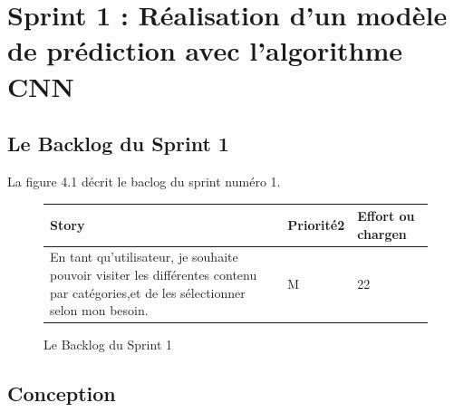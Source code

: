 \chapter{Sprint 1 : Réalisation d’un modèle de prédiction avec l’algorithme CNN}
\label{Chapitre 4} %


\section{Le Backlog du Sprint 1}
La figure 4.1 décrit le baclog du sprint numéro 1.
\begin{figure}[H]
\begin{tabular}{|p{7cm}|p{4cm}|p{4cm}|}
\hline
\textbf{Story} & \textbf{Priorité2 } & \textbf{Effort ou chargen} \\
\hline
En tant qu'utilisateur, je souhaite pouvoir visiter les différentes contenu par catégories,et de les sélectionner selon mon besoin. & \begin{center}M\end{center} & \begin{center}22\end{center}\\
\hline
\end{tabular}
  \caption{Le Backlog du Sprint 1}
  \label{fig:Backlog1}
\end{figure}


\section{Conception}

